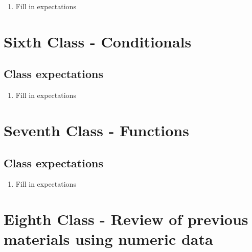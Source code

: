 \documentclass[paper=a4, fontsize=11pt]{scrartcl} %
\numberwithin{equation}{section} %
\numberwithin{figure}{section} %
\numberwithin{table}{section} %
\begin{document}
\begin{enumerate}
\item Fill in expectations 
\end{enumerate}


\section{Sixth Class - Conditionals}


\subsection{Class expectations}

\begin{enumerate}
\item Fill in expectations
\end{enumerate}


\section{Seventh Class - Functions}


\subsection{Class expectations}

\begin{enumerate}
\item Fill in expectations
\end{enumerate}


\section{Eighth Class - Review of previous materials using numeric data}
\end{document}
